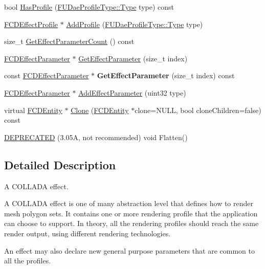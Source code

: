 \begin{DoxyCompactItemize}
\item 
bool \hyperlink{classFCDEffect_a0e210e70a9933fc89f314747edbb3bf5}{HasProfile} (\hyperlink{namespaceFUDaeProfileType_ac10ea253a7a141708de2324a929f8a79}{FUDaeProfileType::Type} type) const 
\item 
\hyperlink{classFCDEffectProfile}{FCDEffectProfile} $\ast$ \hyperlink{classFCDEffect_abe53b1e58ce5469b28f63b5155703a95}{AddProfile} (\hyperlink{namespaceFUDaeProfileType_ac10ea253a7a141708de2324a929f8a79}{FUDaeProfileType::Type} type)
\item 
size\_\-t \hyperlink{classFCDEffect_aa0a011919dc7b8b3e40d07b3110f85b3}{GetEffectParameterCount} () const 
\item 
\hyperlink{classFCDEffectParameter}{FCDEffectParameter} $\ast$ \hyperlink{classFCDEffect_aa426058e105da62cec3eb4f8f3efd31c}{GetEffectParameter} (size\_\-t index)
\item 
\hypertarget{classFCDEffect_ac4da98a447ccfeb406fce54c5a880fd5}{
const \hyperlink{classFCDEffectParameter}{FCDEffectParameter} $\ast$ {\bfseries GetEffectParameter} (size\_\-t index) const }
\label{classFCDEffect_ac4da98a447ccfeb406fce54c5a880fd5}

\item 
\hyperlink{classFCDEffectParameter}{FCDEffectParameter} $\ast$ \hyperlink{classFCDEffect_a19ae444c7d61d619accac5eab4f1ea4e}{AddEffectParameter} (uint32 type)
\item 
virtual \hyperlink{classFCDEntity}{FCDEntity} $\ast$ \hyperlink{classFCDEffect_a7582fbc089f3eff95fd522c20d492b98}{Clone} (\hyperlink{classFCDEntity}{FCDEntity} $\ast$clone=NULL, bool cloneChildren=false) const 
\item 
\hyperlink{classFCDEffect_a20106fd0bb005c517153dc5cedc14a23}{DEPRECATED} (3.05A, not recommended) void Flatten()
\end{DoxyCompactItemize}


\subsection{Detailed Description}
A COLLADA effect.

A COLLADA effect is one of many abstraction level that defines how to render mesh polygon sets. It contains one or more rendering profile that the application can choose to support. In theory, all the rendering profiles should reach the same render output, using different rendering technologies.

An effect may also declare new general purpose parameters that are common to all the profiles. 


